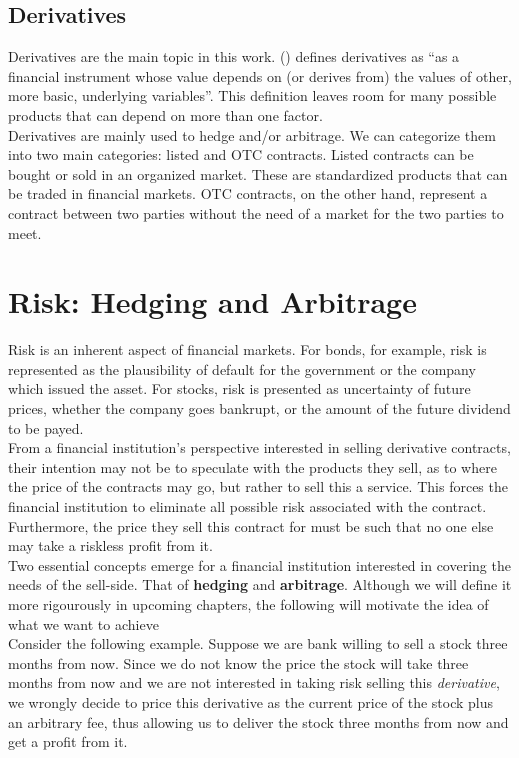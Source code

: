 \documentclass[11pt]{report}
\newcommand{\aycite}[1]{%
 \citeauthor{#1} (\citeyear{#1})}
\begin{document}
\subsection{Derivatives}
Derivatives are the main topic in this work. \aycite{hull} defines derivatives as ``as a financial instrument whose value depends on (or derives from) the values of other, more basic, underlying variables''. This definition leaves room for many possible products that can depend on more than one factor.\\

Derivatives are mainly used to hedge and/or arbitrage. We can categorize them into two main categories: listed and OTC contracts. Listed contracts can be bought or sold in an organized market. These are standardized products that can be traded in financial markets. OTC contracts, on the other hand, represent a contract between two parties without the need of a market for the two parties to meet.

\section{Risk: Hedging and Arbitrage}
Risk is an inherent aspect of financial markets. For bonds, for example, risk is represented as the plausibility of default for the government or the company which issued the asset. For stocks, risk is presented as uncertainty of future prices, whether the company goes bankrupt, or the amount of the future dividend to be payed.\\

From a financial institution's perspective interested in selling derivative contracts, their intention may not be to speculate with the products they sell, as to where the price of the contracts may go, but rather to sell this a service. This forces the financial institution to eliminate all possible risk associated with the contract. Furthermore, the price they sell this contract for must be such that no one else may take a riskless profit from it.\\

Two essential concepts emerge for a financial institution interested in covering the needs of the sell-side. That of \textbf{hedging} and \textbf{arbitrage}. Although we will define it more rigourously in upcoming chapters, the following will motivate the idea of what we want to achieve\\

 Consider the following example. Suppose we are bank willing to sell a stock three months from now. Since we do not know the price the stock will take three months from now and we are not interested in taking risk selling this \textit{derivative}, we wrongly decide to price this derivative as the current price of the stock plus an arbitrary fee, thus allowing us to deliver the stock three months from now and get a profit from it.\\
 
\end{document}
